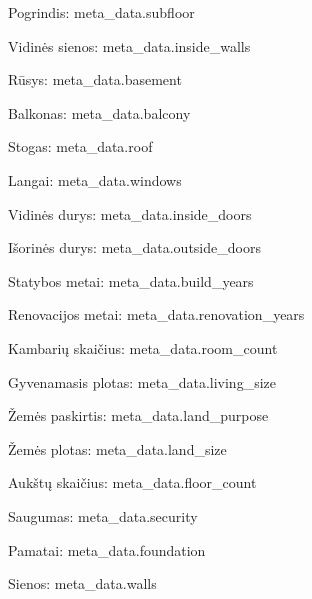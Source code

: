 {{{{{{{\begin{itemize}   
    {%
    \item Pogrindis: {{ meta_data.subfloor }}
    {%
    {%
    \item Vidinės sienos: {{ meta_data.inside_walls }}
    {%
    {%
    \item {Rūsys: {{ meta_data.basement }}}
    {%
    {%
    \item {Balkonas: {{ meta_data.balcony }}}
    {%
    {%
    \item {Stogas: {{ meta_data.roof }}}
    {%
    {%
    \item {Langai: {{ meta_data.windows }}}
    {%
    {%
    \item {Vidinės durys: {{ meta_data.inside_doors }}}
    {%
    {%
    \item {Išorinės durys: {{ meta_data.outside_doors }}}
    {%
    {%
    \item {Statybos metai: {{ meta_data.build_years }}}
    {%
    {%
    \item {Renovacijos metai: {{ meta_data.renovation_years }}}
    {%
    {%
    \item {Kambarių skaičius: {{ meta_data.room_count }}}
    {%
    {%
    \item {Gyvenamasis plotas: {{ meta_data.living_size }}}
    {%
    {%
    \item {Žemės paskirtis: {{ meta_data.land_purpose }}}
    {%
    {%
    \item {Žemės plotas: {{ meta_data.land_size }}}
    {%
    {%
    \item {Aukštų skaičius: {{ meta_data.floor_count }}}
    {%
    {%
    \item {Saugumas: {{ meta_data.security }}}
    {%
    {%
    \item {Pamatai: {{ meta_data.foundation }}}
    {%
    {%
    \item {Sienos: {{ meta_data.walls }}}
    {%

}}}}}}}}}}}}}}}}}}}}}}}}}}}}}}}}}}}}
\end{itemize}}}}}}}}
